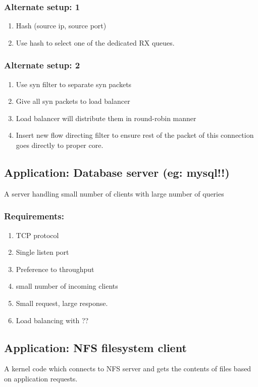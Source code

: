 \subsubsection{Alternate setup: 1}
\begin{enumerate}
       \item Hash (source ip, source port)
       \item Use hash to select one of the dedicated RX queues.
\end{enumerate}

\subsubsection{Alternate setup: 2}
\begin{enumerate}
       \item Use syn filter to separate syn packets
       \item Give all syn packets to load balancer
       \item Load balancer will distribute them in round-robin manner
       \item Insert new flow directing filter to ensure rest of the packet of
        this connection goes directly to proper core.
\end{enumerate}

\subsection{Application:  Database server (eg: mysql!!)}
A server handling small number of clients with large number of queries
\subsubsection{Requirements:}
\begin{enumerate}
    \item TCP protocol
    \item Single listen port
    \item Preference to throughput
    \item small number of incoming clients
    \item Small request, large response.
    \item Load balancing with ??
\end{enumerate}


\subsection{Application: NFS filesystem client}
A kernel code which connects to NFS server and gets the contents of files
based on application requests.
